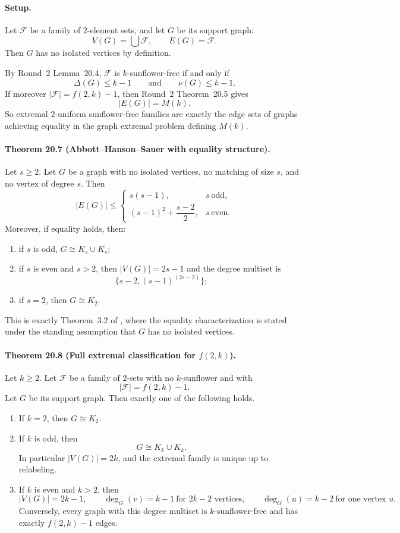 \paragraph{Setup.}
Let $\mathcal F$ be a family of $2$-element sets, and let $G$ be its support graph:
\[
V(G)=\bigcup\mathcal F,
\qquad
E(G)=\mathcal F.
\]
Then $G$ has no isolated vertices by definition.

By Round~2 Lemma~20.4, $\mathcal F$ is $k$-sunflower-free if and only if
\[
\Delta(G)\le k-1
\qquad\text{and}\qquad
\nu(G)\le k-1.
\]
If moreover $|\mathcal F|=f(2,k)-1$, then Round~2 Theorem~20.5 gives
\[
|E(G)|=M(k).
\]
So extremal $2$-uniform sunflower-free families are exactly the edge sets of graphs achieving equality in the graph extremal problem defining $M(k)$.

\paragraph{Theorem 20.7 (Abbott--Hanson--Sauer with equality structure).}
Let $s\ge 2$. Let $G$ be a graph with no isolated vertices, no matching of size $s$, and no vertex of degree $s$. Then
\[
|E(G)|\le
\begin{cases}
 s(s-1), & s\ \text{odd},\\[3pt]
 (s-1)^2+\dfrac{s-2}{2}, & s\ \text{even}.
\end{cases}
\]
Moreover, if equality holds, then:
\begin{enumerate}
\item if $s$ is odd, $G\cong K_s\cup K_s$;
\item if $s$ is even and $s>2$, then $|V(G)|=2s-1$ and the degree multiset is
\[
\{s-2,(s-1)^{(2s-2)}\};
\]
\item if $s=2$, then $G\cong K_2$.
\end{enumerate}
This is exactly Theorem~3.2 of \cite{KupavskiiNoskov2025}, where the equality characterization is stated under the standing assumption that $G$ has no isolated vertices.

\paragraph{Theorem 20.8 (Full extremal classification for $f(2,k)$).}
Let $k\ge 2$. Let $\mathcal F$ be a family of $2$-sets with no $k$-sunflower and with
\[
|\mathcal F|=f(2,k)-1.
\]
Let $G$ be its support graph. Then exactly one of the following holds.
\begin{enumerate}
\item If $k=2$, then $G\cong K_2$.
\item If $k$ is odd, then
\[
G\cong K_k\cup K_k.
\]
In particular $|V(G)|=2k$, and the extremal family is unique up to relabeling.
\item If $k$ is even and $k>2$, then
\[
|V(G)|=2k-1,
\qquad
\deg_G(v)=k-1\ \text{for }2k-2\text{ vertices},
\qquad
\deg_G(u)=k-2\ \text{for one vertex }u.
\]
Conversely, every graph with this degree multiset is $k$-sunflower-free and has exactly $f(2,k)-1$ edges.
\end{enumerate}

